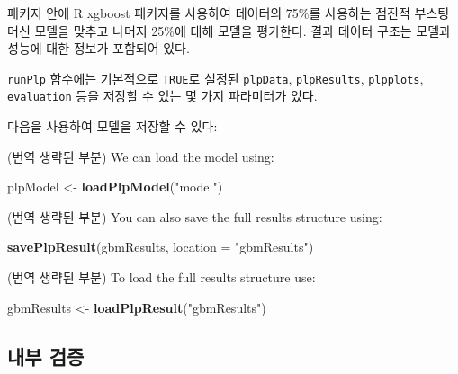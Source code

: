 \documentclass[10.5pt]{book}
\newenvironment{Shaded}{\begin{snugshade}}{\end{snugshade}}
\newcommand{\KeywordTok}[1]{\textcolor[rgb]{0.13,0.29,0.53}{\textbf{#1}}}
\newcommand{\DataTypeTok}[1]{\textcolor[rgb]{0.13,0.29,0.53}{#1}}
\newcommand{\StringTok}[1]{\textcolor[rgb]{0.31,0.60,0.02}{#1}}
\newcommand{\OperatorTok}[1]{\textcolor[rgb]{0.81,0.36,0.00}{\textbf{#1}}}
\newcommand{\NormalTok}[1]{#1}
\theoremstyle{definition}
\theoremstyle{definition}
\theoremstyle{definition}
\theoremstyle{remark}
\begin{document}
패키지 안에 R xgboost 패키지를 사용하여 데이터의 75\%를 사용하는 점진적
부스팅 머신 모델을 맞추고 나머지 25\%에 대해 모델을 평가한다. 결과
데이터 구조는 모델과 성능에 대한 정보가 포함되어 있다.

\texttt{runPlp} 함수에는 기본적으로 \texttt{TRUE}로 설정된
\texttt{plpData}, \texttt{plpResults}, \texttt{plpplots},
\texttt{evaluation} 등을 저장할 수 있는 몇 가지 파라미터가 있다.

다음을 사용하여 모델을 저장할 수 있다:

\begin{Shaded}
\end{Shaded}

(번역 생략된 부분) We can load the model using:

\begin{Shaded}
\begin{Highlighting}[]
\NormalTok{plpModel <-}\StringTok{ }\KeywordTok{loadPlpModel}\NormalTok{(}\StringTok{"model"}\NormalTok{)}
\end{Highlighting}
\end{Shaded}

(번역 생략된 부분) You can also save the full results structure using:

\begin{Shaded}
\begin{Highlighting}[]
\KeywordTok{savePlpResult}\NormalTok{(gbmResults, }\DataTypeTok{location =} \StringTok{"gbmResults"}\NormalTok{)}
\end{Highlighting}
\end{Shaded}

(번역 생략된 부분) To load the full results structure use:

\begin{Shaded}
\begin{Highlighting}[]
\NormalTok{gbmResults <-}\StringTok{ }\KeywordTok{loadPlpResult}\NormalTok{(}\StringTok{"gbmResults"}\NormalTok{)}
\end{Highlighting}
\end{Shaded}

\subsection{내부 검증}\label{-}
\end{document}
